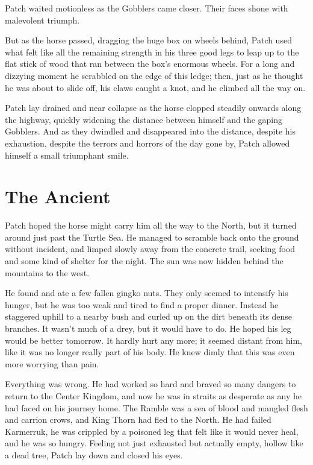 \documentclass[ebook,oneside,openany,12pt]{memoir}
\begin{document}
Patch waited motionless as the Gobblers came closer. Their faces shone
with malevolent triumph.

But as the horse passed, dragging the huge box on wheels behind, Patch
used what felt like all the remaining strength in his three good legs
to leap up to the flat stick of wood that ran between the box’s
enormous wheels. For a long and dizzying moment he scrabbled on the
edge of this ledge; then, just as he thought he was about to slide
off, his claws caught a knot, and he climbed all the way on.

Patch lay drained and near collapse as the horse clopped steadily
onwards along the highway, quickly widening the distance between
himself and the gaping Gobblers. And as they dwindled and disappeared
into the distance, despite his exhaustion, despite the terrors and
horrors of the day gone by, Patch allowed himself a small triumphant
smile.


\section{The Ancient}

Patch hoped the horse might carry him all the way to the North, but it
turned around just past the Turtle Sea. He managed to scramble back
onto the ground without incident, and limped slowly away from the
concrete trail, seeking food and some kind of shelter for the
night. The sun was now hidden behind the mountains to the west.

He found and ate a few fallen gingko nuts. They only seemed to
intensify his hunger, but he was too weak and tired to find a proper
dinner. Instead he staggered uphill to a nearby bush and curled up on
the dirt beneath its dense branches. It wasn’t much of a drey, but it
would have to do. He hoped his leg would be better tomorrow. It hardly
hurt any more; it seemed distant from him, like it was no longer
really part of his body. He knew dimly that this was even more
worrying than pain.

Everything was wrong. He had worked so hard and braved so many dangers
to return to the Center Kingdom, and now he was in straits as
desperate as any he had faced on his journey home. The Ramble was a
sea of blood and mangled flesh and carrion crows, and King Thorn had
fled to the North. He had failed Karmerruk, he was crippled by a
poisoned leg that felt like it would never heal, and he was so
hungry. Feeling not just exhausted but actually empty, hollow like a
dead tree, Patch lay down and closed his eyes.
\end{document}
